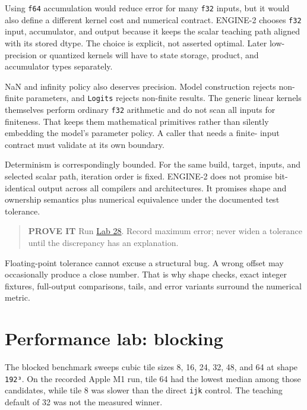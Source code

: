 Using \texttt{f64} accumulation would reduce error for many \texttt{f32}
inputs, but it would also define a different kernel cost and numerical
contract. ENGINE-2 chooses \texttt{f32} input, accumulator, and output
because it keeps the scalar teaching path aligned with its stored dtype.
The choice is explicit, not asserted optimal. Later low-precision or
quantized kernels will have to state storage, product, and accumulator
types separately.

NaN and infinity policy also deserves precision. Model construction
rejects non-finite parameters, and \texttt{Logits} rejects non-finite
results. The generic linear kernels themselves perform ordinary
\texttt{f32} arithmetic and do not scan all inputs for finiteness. That
keeps them mathematical primitives rather than silently embedding the
model's parameter policy. A caller that needs a finite- input contract
must validate at its own boundary.

Determinism is correspondingly bounded. For the same build, target,
inputs, and selected scalar path, iteration order is fixed. ENGINE-2
does not promise bit-identical output across all compilers and
architectures. It promises shape and ownership semantics plus numerical
equivalence under the documented test tolerance.

\begin{quote}
\textbf{PROVE IT} Run
\href{https://github.com/hermonai/inside-the-llm-engine/blob/astra-visual-rewrite/labs/lab-28-kernel-equivalence.md}{Lab
28}. Record maximum error; never widen a tolerance until the discrepancy
has an explanation.
\end{quote}

Floating-point tolerance cannot excuse a structural bug. A wrong offset
may occasionally produce a close number. That is why shape checks, exact
integer fixtures, full-output comparisons, tails, and error variants
surround the numerical metric.

\section{Performance lab: blocking}\label{performance-lab-blocking}

The blocked benchmark sweeps cubic tile sizes 8, 16, 24, 32, 48, and 64
at shape \texttt{192³}. On the recorded Apple M1 run, tile 64 had the
lowest median among those candidates, while tile 8 was slower than the
direct \texttt{ijk} control. The teaching default of 32 was not the
measured winner.

